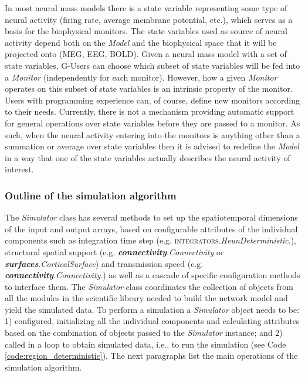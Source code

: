 \documentclass{bioinfo}
\newcommand*{\tvbmodule}[1]{{\textsc{#1}}}          %
\newcommand*{\tvbdatatype}[1]{\textbf{\emph{#1}}}   %
\newcommand*{\tvbclass}[1]{{\ttfamily\emph{#1}}}    %
\newcommand*{\tvbmethod}[1]{{\textsf{#1}}}          %
\newcommand*{\tvbattribute}[1]{{\ttfamily{#1}}}     %
\begin{document}
\begin{methods}
    In most neural mass models there is a state variable representing some type
    of neural activity (firing rate, average membrane potential, etc.), which
    serves as a basis for the biophysical monitors. The state variables used as
    source of neural activity depend both on the \tvbclass{Model} and the
    biophysical space that it will be projected onto (MEG, EEG, BOLD). Given a
    neural mass model with a set of state variables, G-Users can choose which
    subset of state variables will be fed into a \tvbclass{Monitor}
    (independently for each monitor). However, how a given \tvbclass{Monitor}
    operates on this subset of state variables is an intrinsic property of the
    monitor. Users with programming experience can, of course, define new
    monitors according to their needs. Currently, there is not a mechanism
    providing automatic support for general operations over state variables
    before they are passed to a monitor. As such, when the neural activity
    entering into the monitors is anything other than a summation or average
    over state variables then it is advised to redefine the \tvbclass{Model} in
    a way that one of the state variables actually describes the neural activity
    of interest.

    \subsubsection{Outline of the simulation algorithm}
    
    The \tvbclass{Simulator} class has several
    \tvbmethod{methods} to set up the spatiotemporal dimensions of the input
    and output arrays, based on configurable attributes of the individual
    components such as integration time step (e.g.
    \tvbmodule{integrators}.\tvbclass{HeunDeterministic}.\tvbattribute{dt}),
    structural spatial support (e.g.
    \tvbdatatype{connectivity}.\tvbclass{Connectivity} or
    \tvbdatatype{surfaces}.\tvbclass{CorticalSurface}) and transmission speed
    (e.g.
    \tvbdatatype{connectivity}.\tvbclass{Connectivity}.\tvbattribute{speed})
    as well as a cascade of specific \tvbmethod{configuration methods} to
    interface them. The \tvbclass{Simulator} class coordinates the
    collection of objects from all the modules in the scientific library
    needed to build the network model and yield the simulated data.  To perform a
    simulation a \tvbclass{Simulator} object needs to be: 1)  configured,
    initializing all the individual components and calculating attributes
    based on the combination of objects passed to the \tvbclass{Simulator} 
    instance; and 2) called in a loop to obtain simulated data, i.e., to run 
    the simulation (see Code \ref{code:region_deterministic}). The next 
    paragraphs list the main operations of the simulation algorithm. 


\end{methods}
\end{document}
